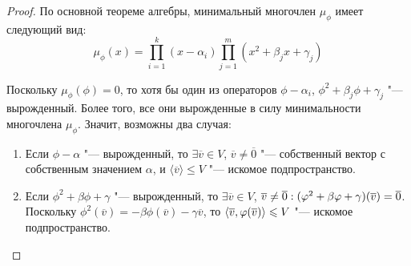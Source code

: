 \begin{proof}
	По основной теореме алгебры, минимальный многочлен $\mu_\phi$ имеет следующий вид:
	\[\mu_\phi(x) = \prod_{i = 1}^k(x - \alpha_i)\prod_{j = 1}^m(x^2 + \beta_jx + \gamma_j)\]
	
	Поскольку $\mu_\phi(\phi) = 0$, то хотя бы один из операторов $\phi - \alpha_i$, $\phi^2 + \beta_j\phi + \gamma_j$ "--- вырожденный. Более того, все они вырожденные в силу минимальности многочлена $\mu_\phi$. Значит, возможны два случая:
	\begin{enumerate}
		\item Если $\phi - \alpha$ "--- вырожденный, то $\exists \overline{v} \in V$, $\overline{v} \ne \overline{0}$ "--- собственный вектор с собственным значением $\alpha$, и $\langle\overline{v}\rangle \le V$ "--- искомое подпространство.
		\item Если $\phi^2 + \beta\phi + \gamma$ "--- вырожденный, то $\exists \overline{v} \in V$, $\overline{v} \ne \overline{0}: (\phi^2 + \beta\phi \hm{+} \gamma)(\overline{v}) \hm{=} \overline{0}$. Поскольку $\phi^2(\overline{v}) = -\beta\phi(\overline{v}) - \gamma\overline{v}$, то $\langle\overline{v}, \phi(\overline{v})\rangle \hm{\le} V$ "--- искомое подпространство.\qedhere
	\end{enumerate}
\end{proof}
